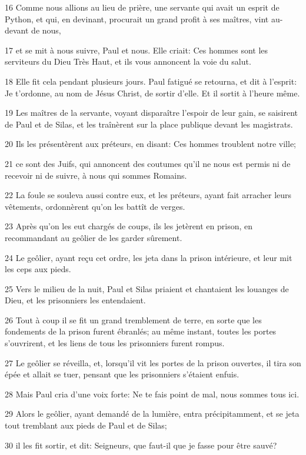 \par 16 Comme nous allions au lieu de prière, une servante qui avait un esprit de Python, et qui, en devinant, procurait un grand profit à ses maîtres, vint au-devant de nous,
\par 17 et se mit à nous suivre, Paul et nous. Elle criait: Ces hommes sont les serviteurs du Dieu Très Haut, et ils vous annoncent la voie du salut.
\par 18 Elle fit cela pendant plusieurs jours. Paul fatigué se retourna, et dit à l'esprit: Je t'ordonne, au nom de Jésus Christ, de sortir d'elle. Et il sortit à l'heure même.
\par 19 Les maîtres de la servante, voyant disparaître l'espoir de leur gain, se saisirent de Paul et de Silas, et les traînèrent sur la place publique devant les magistrats.
\par 20 Ils les présentèrent aux préteurs, en disant: Ces hommes troublent notre ville;
\par 21 ce sont des Juifs, qui annoncent des coutumes qu'il ne nous est permis ni de recevoir ni de suivre, à nous qui sommes Romains.
\par 22 La foule se souleva aussi contre eux, et les préteurs, ayant fait arracher leurs vêtements, ordonnèrent qu'on les battît de verges.
\par 23 Après qu'on les eut chargés de coups, ils les jetèrent en prison, en recommandant au geôlier de les garder sûrement.
\par 24 Le geôlier, ayant reçu cet ordre, les jeta dans la prison intérieure, et leur mit les ceps aux pieds.
\par 25 Vers le milieu de la nuit, Paul et Silas priaient et chantaient les louanges de Dieu, et les prisonniers les entendaient.
\par 26 Tout à coup il se fit un grand tremblement de terre, en sorte que les fondements de la prison furent ébranlés; au même instant, toutes les portes s'ouvrirent, et les liens de tous les prisonniers furent rompus.
\par 27 Le geôlier se réveilla, et, lorsqu'il vit les portes de la prison ouvertes, il tira son épée et allait se tuer, pensant que les prisonniers s'étaient enfuis.
\par 28 Mais Paul cria d'une voix forte: Ne te fais point de mal, nous sommes tous ici.
\par 29 Alors le geôlier, ayant demandé de la lumière, entra précipitamment, et se jeta tout tremblant aux pieds de Paul et de Silas;
\par 30 il les fit sortir, et dit: Seigneurs, que faut-il que je fasse pour être sauvé?
